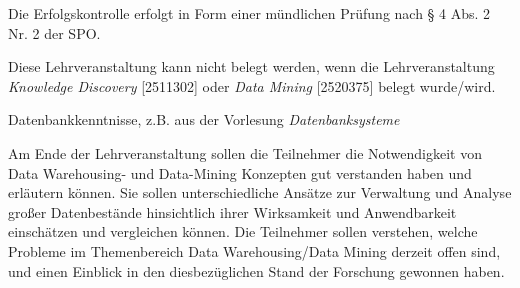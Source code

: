 \begin{course}

\setdoclanguagegerman
{}



\coursehead


\label{cour_4525.dp_997}


\begin{styleenv}
\begin{assessment}
Die Erfolgskontrolle erfolgt in Form einer mündlichen Prüfung nach § 4 Abs. 2 Nr. 2 der SPO.


\end{assessment}

\begin{conditions}Diese Lehrveranstaltung kann nicht belegt werden, wenn die Lehrveranstaltung \emph{Knowledge Discovery} [2511302] oder \emph{Data Mining} [2520375] belegt wurde/wird.

\end{conditions}

\begin{recommendations}Datenbankkenntnisse, z.B. aus der Vorlesung\emph{ Datenbanksysteme}

\end{recommendations}
\end{styleenv}

\begin{learningoutcomes}
Am Ende der Lehrveranstaltung sollen die Teilnehmer die Notwendigkeit von Data Warehousing- und Data-Mining Konzepten gut verstanden haben und erläutern können. Sie sollen unterschiedliche Ansätze zur Verwaltung und Analyse großer Datenbestände hinsichtlich ihrer Wirksamkeit und Anwendbarkeit einschätzen und vergleichen können. Die Teilnehmer sollen verstehen, welche Probleme im Themenbereich Data Warehousing/Data Mining derzeit offen sind, und einen Einblick in den diesbezüglichen Stand der Forschung gewonnen haben.



\end{learningoutcomes}
\end{course}
